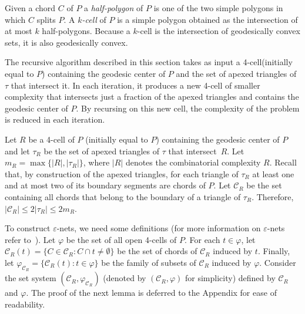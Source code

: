 \documentclass[a4paper]{article}
\newcommand{\F}[2]{\ensuremath{F_{\scriptscriptstyle #1}(#2)}}
\newcommand{\ff}[1]{\ensuremath{f(#1)}}
\newcommand{\m}{\ensuremath{m_{\scriptscriptstyle R}}}
\newcommand{\tcell}{4-cell\xspace}
\newcommand{\tcells}{4-cells\xspace}
\newcommand{\C}{\ensuremath{{\mathcal C_R}}}
\begin{document}


Given a chord $C$ of $P$ a \emph{half-polygon} of $P$ is one of the two simple polygons in which $C$ splits $P$.
A \emph{$k$-cell} of $P$ is a simple polygon obtained as the intersection of at most $k$ half-polygons.
Because a $k$-cell is the intersection of geodesically convex sets, it is also geodesically convex. 

The recursive algorithm described in this section takes as input a \tcell (initially equal to $P$) containing the geodesic center of $P$ and the set of apexed triangles of $\tau$ that intersect it. In each iteration, it produces a new \tcell of smaller complexity that intersects just a fraction of the apexed triangles and contains the geodesic center of $P$. By recursing on this new cell, the complexity of the problem is reduced in each iteration.

Let $R$ be a \tcell of $P$ (initially equal to $P$) containing the geodesic center of $P$ and let $\tau_R$ be the set of apexed triangles of $\tau$ that intersect~$R$. 
Let $\m = \max\{|R|, |\tau_R|\}$, where $|R|$ denotes the combinatorial complexity $R$.
Recall that, by construction of the apexed triangles, for each triangle of $\tau_R$ at least one and at most two of its boundary segments are chords of $P$.
Let $\C$ be the set containing all chords that belong to the boundary of a triangle of $\tau_R$. 
Therefore, $|\C| \leq 2|\tau_R|\leq 2\m$.

To construct $\varepsilon$-nets, we need some definitions (for more information on $\varepsilon$-nets refer to~\cite{ConstructionEpsilonNets}).
Let $\varphi$ be the set of all open \tcells of $P$.
For each $t\in \varphi$, let $\C(t) = \{C\in \C: C\cap t \neq \emptyset\}$ be the set of chords of $\C$ induced by $t$. 
Finally, let $\varphi_\C = \{\C(t) : t\in \varphi\}$ be the family of subsets of $\C$ induced by $\varphi$.
Consider the set system $(\C, \varphi_\C)$ (denoted by $(\C, \varphi)$ for simplicity) defined by $\C$ and $\varphi$. 
The proof of the next lemma is deferred to the Appendix for ease of readability.
\end{document}
